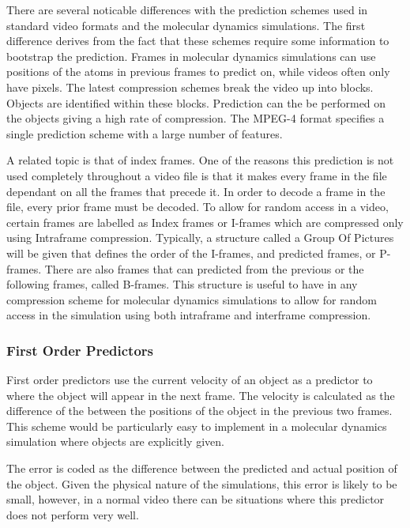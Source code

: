 \documentclass[a4paper,11pt]{report}
\begin{document}
There are several noticable differences with the prediction schemes used in standard video formats and the molecular dynamics simulations. The first difference derives from the fact that these schemes require some information to bootstrap the prediction. Frames in molecular dynamics simulations can use positions of the atoms in previous frames to predict on, while videos often only have pixels. The latest compression schemes break the video up into blocks. Objects are identified within these blocks. Prediction can the be performed on the objects giving a high rate of compression. The MPEG-4 format specifies a single prediction scheme with a large number of features\cite{wiegand2003oha}. 

A related topic is that of index frames. One of the reasons this prediction is not used completely throughout a video file is that it makes every frame in the file dependant on all the frames that precede it. In order to decode a frame in the file, every prior frame must be decoded. To allow for random access in a video, certain frames are labelled as Index frames or I-frames which are compressed only using Intraframe compression. Typically, a structure called a Group Of Pictures will be given that defines the order of the I-frames, and predicted frames, or P-frames\cite{vandalore2001sal}. There are also frames that can predicted from the previous or the following frames, called B-frames. This structure is useful to have in any compression scheme for molecular dynamics simulations to allow for random access in the simulation using both intraframe and interframe compression.

\subsubsection{First Order Predictors}

First order predictors use the current velocity of an object as a predictor to where the object will appear in the next frame. The velocity is calculated as the difference of the between the positions of the object in the previous two frames. This scheme would be particularly easy to implement in a molecular dynamics simulation where objects are explicitly given.

The error is coded as the difference between the predicted and actual position of the object. Given the physical nature of the simulations, this error is likely to be small, however, in a normal video there can be situations where this predictor does not perform very well.
\end{document}
